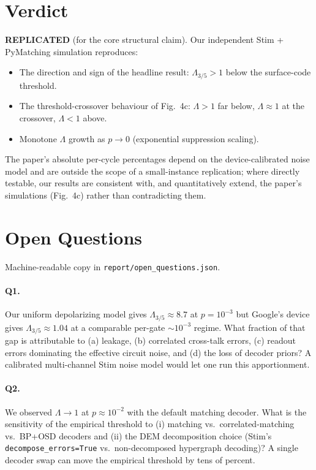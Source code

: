 \documentclass[11pt]{article}
\begin{document}
\section{Verdict}
\textbf{REPLICATED} (for the core structural claim). Our independent Stim + PyMatching
simulation reproduces:
\begin{itemize}
  \item The direction and sign of the headline result: $\Lambda_{3/5} > 1$
        below the surface-code threshold.
  \item The threshold-crossover behaviour of Fig.~4c: $\Lambda>1$ far below,
        $\Lambda\approx 1$ at the crossover, $\Lambda<1$ above.
  \item Monotone $\Lambda$ growth as $p\to 0$ (exponential suppression scaling).
\end{itemize}
The paper's absolute per-cycle percentages depend on the device-calibrated
noise model and are outside the scope of a small-instance replication;
where directly testable, our results are consistent with, and quantitatively
extend, the paper's simulations (Fig.~4c) rather than contradicting them.

\section{Open Questions}
Machine-readable copy in \texttt{report/open\_questions.json}.

\paragraph{Q1.} Our uniform depolarizing model gives $\Lambda_{3/5}\!\approx\!8.7$
at $p=10^{-3}$ but Google's device gives $\Lambda_{3/5}\!\approx\!1.04$ at a
comparable per-gate $\sim\!10^{-3}$ regime. What fraction of that gap is
attributable to (a) leakage, (b) correlated cross-talk errors, (c)
readout errors dominating the effective circuit noise, and (d) the loss
of decoder priors? A calibrated multi-channel Stim noise model would let one
run this apportionment.

\paragraph{Q2.} We observed $\Lambda\to 1$ at $p\!\approx\!10^{-2}$ with the
default matching decoder. What is the sensitivity of the empirical threshold
to (i) matching vs.\ correlated-matching vs.\ BP+OSD decoders and (ii) the
DEM decomposition choice (Stim's \texttt{decompose\_errors=True} vs.\
non-decomposed hypergraph decoding)? A single decoder swap can move the
empirical threshold by tens of percent.
\end{document}

